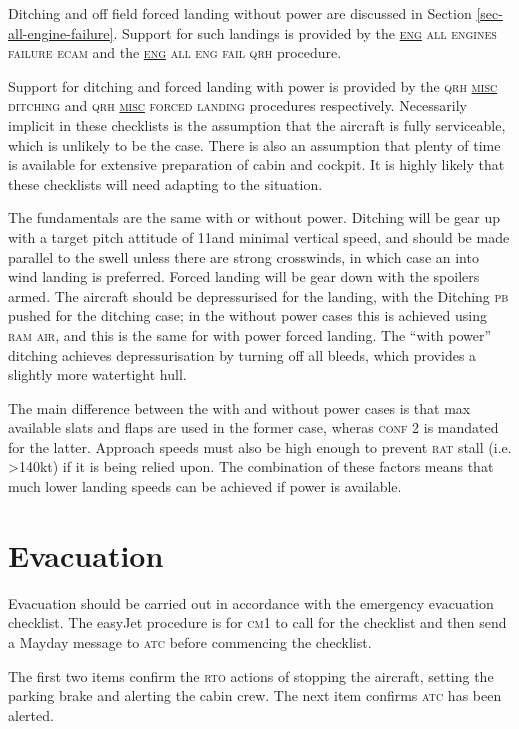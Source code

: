 \documentclass[a5paper,11pt,twoside]{book}
\newcommand{\ac}[1]{{\scshape\MakeLowercase{#1}}}
\newcommand{\ecam}[2]{{\ac{\uline{#1} #2}}}
\newcommand{\inlcite}[1]{{\ac{#1}}}
\newcommand{\multicite}[1]{%
  \nopagebreak
  \noindent{{\color{blue}\footnotesize[ \inlcite{#1} ]}}
}
\begin{document}
Ditching and off field forced landing without power are discussed in Section
\ref{sec-all-engine-failure}. Support for such landings is provided by the
\ecam{ENG}{ALL ENGINES FAILURE} \ac{ECAM} and the \ecam{ENG}{ALL ENG FAIL}
\ac{QRH} procedure.

Support for ditching and forced landing with power is provided by the \ac{QRH}
\ecam{MISC}{Ditching} and \ac{QRH} \ecam{MISC}{Forced Landing} procedures
respectively. Necessarily implicit in these checklists is the assumption that
the aircraft is fully serviceable, which is unlikely to be the case. There is
also an assumption that plenty of time is available for extensive preparation of
cabin and cockpit. It is highly likely that these checklists will need adapting
to the situation.

The fundamentals are the same with or without power. Ditching will be gear up
with a target pitch attitude of 11\textdegree{ }and minimal vertical speed, and
should be made parallel to the swell unless there are strong crosswinds, in
which case an into wind landing is preferred. Forced landing will be gear down
with the spoilers armed. The aircraft should be depressurised for the landing,
with the Ditching \ac{PB} pushed for the ditching case; in the without power
cases this is achieved using \ac{RAM AIR}, and this is the same for with power
forced landing. The ``with power'' ditching achieves depressurisation by turning
off all bleeds, which provides a slightly more watertight hull.

The main difference between the with and without power cases is that max
available slats and flaps are used in the former case, wheras \ac{CONF} 2 is
mandated for the latter. Approach speeds must also be high enough to prevent
\ac{RAT} stall (i.e. >140kt) if it is being relied upon. The combination of
these factors means that much lower landing speeds can be achieved if power is
available.

\multicite{QRH~AEP.MISC}

\section{Evacuation}
\label{sec-evacuation}
Evacuation should be carried out in accordance with the emergency evacuation
checklist. The easyJet procedure is for \ac{CM}1 to call for the checklist and
then send a Mayday message to \ac{ATC} before commencing the checklist.

The first two items confirm the \ac{RTO} actions of stopping the aircraft,
setting the parking brake and alerting the cabin crew. The next item confirms
\ac{ATC} has been alerted.
\end{document}
